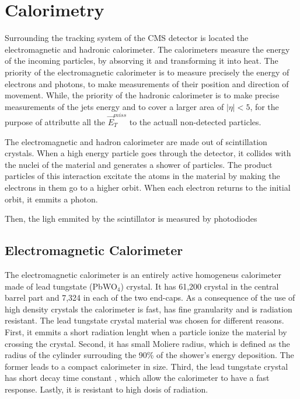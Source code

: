 
\section{Calorimetry}

Surrounding the tracking system of the CMS detector is located the electromagnetic and hadronic calorimeter. The calorimeters measure the energy of the incoming particles, by absorving it and transforming it into heat. The priority of the electromagnetic calorimeter is to measure precisely the energy of electrons and photons, to make measurements of their position and direction of movement. While, the priority of the hadronic calorimeter is to make precise measurements of the jets energy and to cover a larger area of $|\eta| < 5$, for the purpose of attributte all the $\vec{E}_T^{miss}$ to the actuall non-detected particles. 

The electromagnetic and hadron calorimeter are made out of scintillation crystals. When a high energy particle goes through the detector, it collides with the nuclei of the material and generates a shower of particles. The product particles of this interaction excitate the atoms in the material by making the electrons in them go to a higher orbit. When each electron returns to the initial orbit, it emmits a photon. 

Then, the ligh emmited by the scintillator is measured by photodiodes  

\subsection{Electromagnetic Calorimeter}

The electromagnetic calorimeter is an entirely active homogeneus calorimeter made of lead tungstate (PbWO$_4$) crystal. It has 61,200 crystal in the central barrel part and 7,324  in each of the two end-caps. As a consequence of the use of high density crystals the calorimeter is fast, has fine granularity and is radiation resistant. The lead tungstate crystal material was chosen for different reasons. First, it emmits a short radiation lenght when a particle ionize the material by crossing the crystal. Second, it has small Moliere radius, which is defined as the radius of the cylinder surrouding the 90\% of the shower's energy deposition. The former leads to a compact calorimeter in size. Third, the lead tungstate crystal has short decay time constant , which allow the calorimeter to have a fast response. Lastly, it is resistant to high dosis of radiation. 


